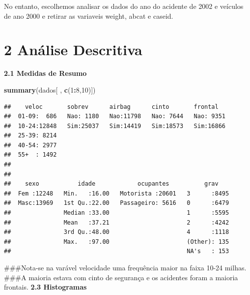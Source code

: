 \documentclass[]{article}
\newenvironment{Shaded}{\begin{snugshade}}{\end{snugshade}}
\newcommand{\KeywordTok}[1]{\textcolor[rgb]{0.13,0.29,0.53}{\textbf{#1}}}
\newcommand{\DecValTok}[1]{\textcolor[rgb]{0.00,0.00,0.81}{#1}}
\newcommand{\OperatorTok}[1]{\textcolor[rgb]{0.81,0.36,0.00}{\textbf{#1}}}
\newcommand{\NormalTok}[1]{#1}
\begin{document}
No entanto, escolhemos analisar os dados do ano do acidente de 2002 e
veículos de ano 2000 e retirar as variaveis weight, abcat e caseid.

\hypertarget{analise-descritiva}{%
\section{2 Análise Descritiva}\label{analise-descritiva}}

\textbf{2.1 Medidas de Resumo}

\begin{Shaded}
\begin{Highlighting}[]
\KeywordTok{summary}\NormalTok{(dados[ , }\KeywordTok{c}\NormalTok{(}\DecValTok{1}\OperatorTok{:}\DecValTok{8}\NormalTok{,}\DecValTok{10}\NormalTok{)])}
\end{Highlighting}
\end{Shaded}

\begin{verbatim}
##    veloc       sobrev      airbag      cinto       frontal    
##  01-09:  686   Nao: 1180   Nao:11798   Nao: 7644   Nao: 9351  
##  10-24:12848   Sim:25037   Sim:14419   Sim:18573   Sim:16866  
##  25-39: 8214                                                  
##  40-54: 2977                                                  
##  55+  : 1492                                                  
##                                                               
##                                                               
##    sexo           idade            ocupantes          grav     
##  Fem :12248   Min.   :16.00   Motorista :20601   3      :8495  
##  Masc:13969   1st Qu.:22.00   Passageiro: 5616   0      :6479  
##               Median :33.00                      1      :5595  
##               Mean   :37.21                      2      :4242  
##               3rd Qu.:48.00                      4      :1118  
##               Max.   :97.00                      (Other): 135  
##                                                  NA's   : 153
\end{verbatim}

\#\#\#Nota-se na varável velocidade uma frequência maior na faixa 10-24
milhas. \#\#\#A maioria estava com cinto de segurança e os acidentes
foram a maioria frontais. \textbf{2.3 Histogramas}
\end{document}
